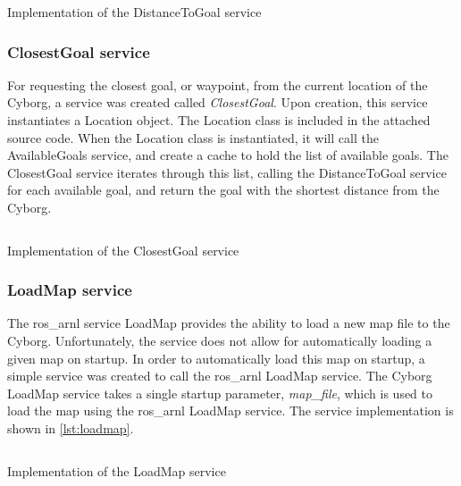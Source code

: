 \documentclass[\rootfolder/main.tex]{subfiles}
\begin{document}
\begin{listing}
    \inputminted[fontsize=\scriptsize]{python}{\rootfolder/Chapters/Chapter6/Listings/distance_to_goal.py}
    \caption{Implementation of the DistanceToGoal service \label{lst:distancetogoal}}
\end{listing}

\subsubsection{ClosestGoal service}

For requesting the closest goal, or waypoint, from the current location of the Cyborg, a service was created called \emph{ClosestGoal}.
Upon creation, this service instantiates a Location object.
The Location class is included in the attached source code.
When the Location class is instantiated, it will call the AvailableGoals service, and create a cache to hold the list of available goals.
The ClosestGoal service iterates through this list, calling the DistanceToGoal service for each available goal, and return the goal with the shortest distance from the Cyborg.

\begin{listing}
    \inputminted[fontsize=\scriptsize]{python}{\rootfolder/Chapters/Chapter6/Listings/closest_goal.py}
    \caption{Implementation of the ClosestGoal service \label{lst:closestgoal}}
\end{listing}

\subsubsection{LoadMap service}

The ros\_arnl service LoadMap provides the ability to load a new map file to the Cyborg.
Unfortunately, the service does not allow for automatically loading a given map on startup.
In order to automatically load this map on startup, a simple service was created to call the ros\_arnl LoadMap service.
The Cyborg LoadMap service takes a single startup parameter, \emph{map\_file}, which is used to load the map using the ros\_arnl LoadMap service.
The service implementation is shown in \cref{lst:loadmap}.

\begin{listing}
    \inputminted[fontsize=\scriptsize]{python}{\rootfolder/Chapters/Chapter6/Listings/load_map.py}
    \caption{Implementation of the LoadMap service \label{lst:loadmap}}
\end{listing}
\end{document}
